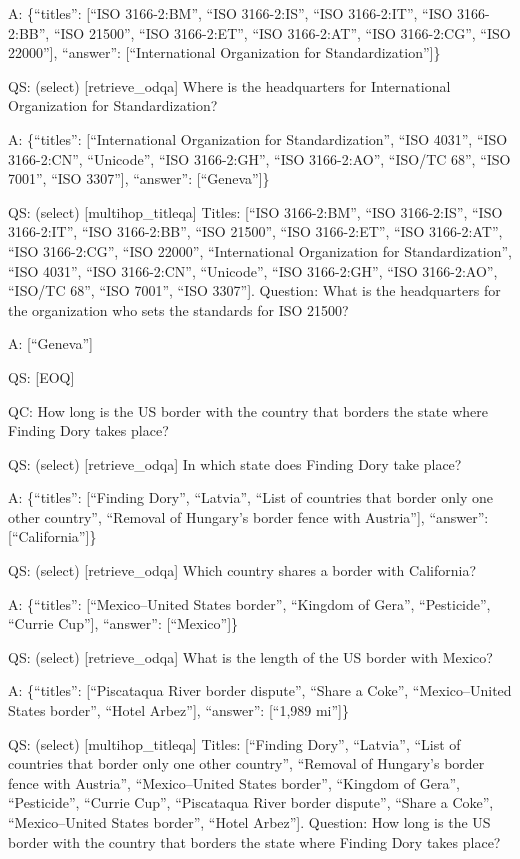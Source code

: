 \documentclass[
]{article}
\begin{document}
A: \{``titles'': {[}``ISO 3166-2:BM'', ``ISO 3166-2:IS'', ``ISO
3166-2:IT'', ``ISO 3166-2:BB'', ``ISO 21500'', ``ISO 3166-2:ET'', ``ISO
3166-2:AT'', ``ISO 3166-2:CG'', ``ISO 22000''{]}, ``answer'':
{[}``International Organization for Standardization''{]}\}

QS: (select) {[}retrieve\_odqa{]} Where is the headquarters for
International Organization for Standardization?

A: \{``titles'': {[}``International Organization for Standardization'',
``ISO 4031'', ``ISO 3166-2:CN'', ``Unicode'', ``ISO 3166-2:GH'', ``ISO
3166-2:AO'', ``ISO/TC 68'', ``ISO 7001'', ``ISO 3307''{]}, ``answer'':
{[}``Geneva''{]}\}

QS: (select) {[}multihop\_titleqa{]} Titles: {[}``ISO 3166-2:BM'', ``ISO
3166-2:IS'', ``ISO 3166-2:IT'', ``ISO 3166-2:BB'', ``ISO 21500'', ``ISO
3166-2:ET'', ``ISO 3166-2:AT'', ``ISO 3166-2:CG'', ``ISO 22000'',
``International Organization for Standardization'', ``ISO 4031'', ``ISO
3166-2:CN'', ``Unicode'', ``ISO 3166-2:GH'', ``ISO 3166-2:AO'', ``ISO/TC
68'', ``ISO 7001'', ``ISO 3307''{]}. Question: What is the headquarters
for the organization who sets the standards for ISO 21500?

A: {[}``Geneva''{]}

QS: {[}EOQ{]}

QC: How long is the US border with the country that borders the state
where Finding Dory takes place?

QS: (select) {[}retrieve\_odqa{]} In which state does Finding Dory take
place?

A: \{``titles'': {[}``Finding Dory'', ``Latvia'', ``List of countries
that border only one other country'', ``Removal of Hungary's border
fence with Austria''{]}, ``answer'': {[}``California''{]}\}

QS: (select) {[}retrieve\_odqa{]} Which country shares a border with
California?

A: \{``titles'': {[}``Mexico--United States border'', ``Kingdom of
Gera'', ``Pesticide'', ``Currie Cup''{]}, ``answer'': {[}``Mexico''{]}\}

QS: (select) {[}retrieve\_odqa{]} What is the length of the US border
with Mexico?

A: \{``titles'': {[}``Piscataqua River border dispute'', ``Share a
Coke'', ``Mexico--United States border'', ``Hotel Arbez''{]},
``answer'': {[}``1,989 mi''{]}\}

QS: (select) {[}multihop\_titleqa{]} Titles: {[}``Finding Dory'',
``Latvia'', ``List of countries that border only one other country'',
``Removal of Hungary's border fence with Austria'', ``Mexico--United
States border'', ``Kingdom of Gera'', ``Pesticide'', ``Currie Cup'',
``Piscataqua River border dispute'', ``Share a Coke'', ``Mexico--United
States border'', ``Hotel Arbez''{]}. Question: How long is the US border
with the country that borders the state where Finding Dory takes place?
\end{document}

